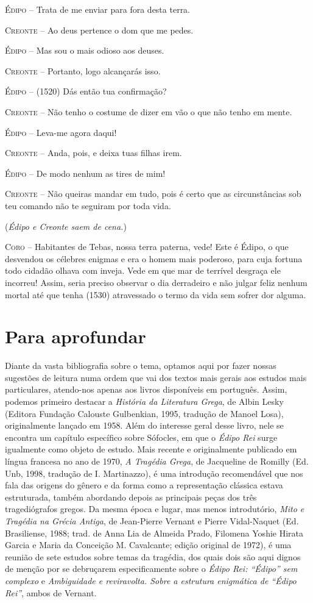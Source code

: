 \textsc{Édipo} --   Trata de me enviar para fora desta terra.

\textsc{Creonte} --   Ao deus pertence o dom que me pedes.

\textsc{Édipo} --   Mas sou o mais odioso aos deuses.

\textsc{Creonte} --   Portanto, logo alcançarás isso.

\textsc{Édipo} --   (1520) Dás então tua confirmação?

\textsc{Creonte} --   Não tenho o costume de dizer em vão o que não tenho em mente.

\textsc{Édipo} --   Leva-me agora daqui!

\textsc{Creonte} --   Anda, pois, e deixa tuas filhas irem.

\textsc{Édipo} --   De modo nenhum as tires de mim!

\textsc{Creonte} --   Não queiras mandar em tudo, pois é certo que as circunstâncias sob teu
comando não te seguiram por toda vida.

(\emph{Édipo e Creonte saem de cena.})

\textsc{Coro} --   Habitantes de Tebas, nossa terra paterna, vede! Este é Édipo, o que
desvendou os célebres enigmas e era o homem mais poderoso, para cuja
fortuna todo cidadão olhava com inveja. Vede em que mar de terrível
desgraça ele incorreu! Assim, seria preciso observar o dia derradeiro e
não julgar feliz nenhum mortal até que tenha (1530) atravessado o termo
da vida sem sofrer dor alguma.

\chapter{Para aprofundar}

Diante da vasta bibliografia sobre o tema, optamos aqui por fazer nossas
sugestões de leitura numa ordem que vai dos textos mais gerais aos
estudos mais particulares, atendo-nos apenas aos livros disponíveis em
português. Assim, podemos primeiro destacar a \emph{História da
Literatura Grega}, de Albin Lesky (Editora Fundação Calouste
Gulbenkian, 1995, tradução de Manoel Losa), originalmente lançado em
1958. Além do interesse geral desse livro, nele se encontra um capítulo
específico sobre Sófocles, em que o \emph{Édipo Rei} surge igualmente
como objeto de estudo. Mais recente e originalmente publicado em língua
francesa no ano de 1970, \emph{A Tragédia Grega}, de Jacqueline
de Romilly (Ed. Unb, 1998, tradução de I. Martinazzo), é uma introdução
recomendável que nos fala das origens do gênero e da forma como a
representação clássica estava estruturada, também abordando depois as
principais peças dos três tragediógrafos gregos. Da mesma época e lugar,
mas menos introdutório, \emph{Mito e Tragédia na Grécia
Antiga}, de Jean-Pierre Vernant e Pierre Vidal-Naquet (Ed. Brasiliense,
1988; trad. de Anna Lia de Almeida Prado, Filomena Yoshie Hirata Garcia
e Maria da Conceição M. Cavalcante; edição original de 1972), é uma
reunião de sete estudos sobre temas da tragédia, dos quais dois são aqui
dignos de menção por se debruçarem especificamente sobre o \emph{Édipo
Rei: ``Édipo'' sem complexo} e \emph{Ambiguidade e reviravolta.
Sobre a estrutura enigmática de ``Édipo Rei''}, ambos de Vernant.

